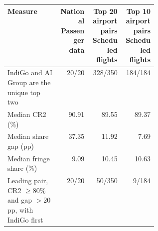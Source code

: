 \begin{tabular}{@{}>{\raggedright\arraybackslash}p{0.35\linewidth}rrr@{}}
\toprule
Measure & \shortstack{National\\Passenger data} & \shortstack{Top 20\\airport pairs\\Scheduled flights} & \shortstack{Top 10\\airport pairs\\Scheduled flights} \\
\midrule
IndiGo and AI Group are the unique top two & 20/20 & 328/350 & 184/184 \\
Median CR2 (\%) & 90.91 & 89.55 & 89.37 \\
Median share gap (pp) & 37.35 & 11.92 & 7.69 \\
Median fringe share (\%) & 9.09 & 10.45 & 10.63 \\
Leading pair, CR2 $\geq80\%$ and gap $>20$ pp, with IndiGo first & 20/20 & 50/350 & 9/184 \\
\bottomrule
\end{tabular}
